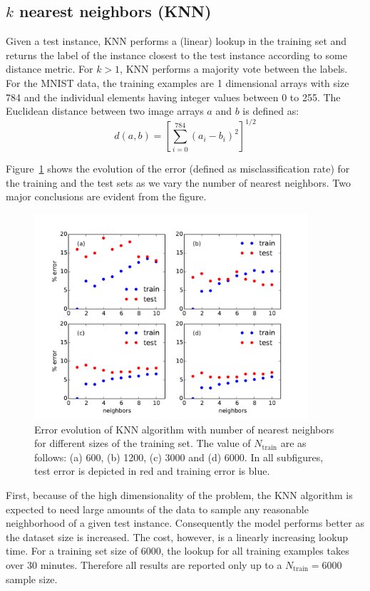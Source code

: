 \documentclass[10pt,letterpaper]{article}
\begin{document}
\subsection{$k$ nearest neighbors (KNN)}
Given a test instance, KNN performs a (linear) lookup in the training set and returns the label of the instance closest to the test instance according to some distance metric. For $k>1$, KNN performs a majority vote between the labels. For the MNIST data, the training examples are 1 dimensional arrays with size 784 and the individual elements having integer values between 0 to 255. The Euclidean distance between two image arrays $a$ and $b$ is defined as:
\begin{equation}
	d(a,b) = \left[\sum_{i=0}^{784}(a_i - b_i)^2\right]^{1/2}
\end{equation}

Figure~\ref{knn1} shows the evolution of the error (defined as misclassification rate) for the training and the test sets as we vary the number of nearest neighbors. Two major conclusions are evident from the figure.
\begin{figure}[tbp]
	\begin{center}
	\includegraphics[width=4in]{../results/mnist/knn/error_vs_nbrs.pdf}
	\end{center}
	\caption{Error evolution of KNN algorithm with number of nearest neighbors for different sizes of the training set. The value of $N_{\text{train}}$ are as follows: (a) 600, (b) 1200, (c) 3000 and  (d) 6000. In all subfigures, test error is depicted in {\color{red} red} and training error is {\color{blue} blue}. \label{knn1}}
\end{figure}
First, because of the high dimensionality of the problem, the KNN algorithm is expected to need large amounts of the data to sample any reasonable neighborhood of a given test instance. Consequently the model performs better as the dataset size is increased. The cost, however, is a linearly increasing lookup time. For a training set size of 6000, the lookup for all training examples takes over 30 minutes. Therefore all results are reported only up to a $N_{\text{train}} = 6000$ sample size. 
\end{document}
